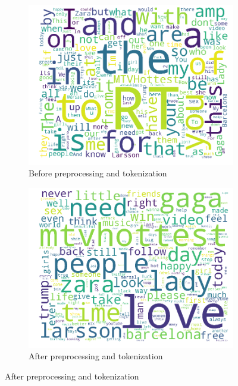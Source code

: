 \begin{figure}
    \centering
    \caption{Wordcloud of the statuses collected from the sample stream}
    \label{fig:test}
    \begin{subfigure}{.5\textwidth}
        \centering
        \caption{Before preprocessing and tokenization}
        \label{fig:wordloud_pre}
        \includegraphics[width=\textwidth]{../images/wordcloud_pre.png}
    \end{subfigure}%
    \begin{subfigure}{.5\textwidth}
        \centering
        \caption{After preprocessing and tokenization}
        \label{fig:wordloud_post}
        \includegraphics[width=\textwidth]{../images/wordcloud_post.png}
    \end{subfigure}
\end{figure}